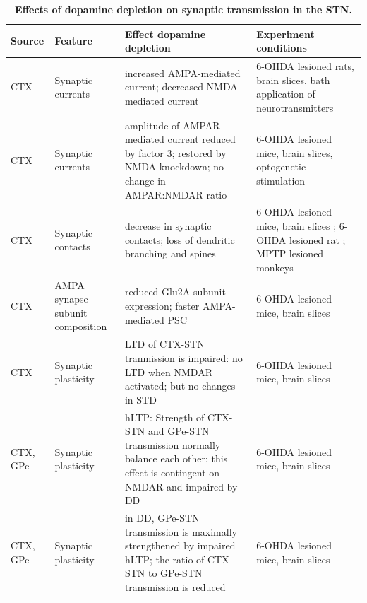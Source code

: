 %
\begin{table} %
\centering
\caption{{\bf Effects of dopamine depletion on synaptic transmission in the STN.}}
%
\begin{tabular}{p{0.06\textheight}p{0.15\textheight}p{0.35\textheight}p{0.35\textheight}}%
\toprule
Source & Feature & Effect dopamine depletion & Experiment conditions \\ \midrule
CTX & Synaptic currents & increased AMPA-mediated current; decreased NMDA-mediated current & 6-OHDA lesioned rats, brain slices, bath application of neurotransmitters \cite{shen_dopamine_2005} \\
CTX & Synaptic currents & amplitude of AMPAR-mediated current reduced by factor 3; restored by NMDA knockdown; no change in AMPAR:NMDAR ratio & 6-OHDA lesioned mice, brain slices, optogenetic stimulation \cite{chu_loss_2017} \\
CTX & Synaptic contacts & decrease in synaptic contacts; loss of dendritic branching and spines & 6-OHDA lesioned mice, brain slices \cite{chu_loss_2017}; 6-OHDA lesioned rat \cite{wang_impaired_2018}; MPTP lesioned monkeys \cite{mathai_reduced_2015} \\
CTX & AMPA synapse subunit composition & reduced Glu2A subunit expression; faster AMPA-mediated PSC & 6-OHDA lesioned mice, brain slices \cite{chu_loss_2017} \\
CTX & Synaptic plasticity & LTD of CTX-STN tranmission is impaired: no LTD when NMDAR activated; but no changes in STD & 6-OHDA lesioned mice, brain slices \cite{chu_loss_2017} \\
CTX, GPe & Synaptic plasticity & hLTP: Strength of CTX-STN and GPe-STN transmission normally balance each other; this effect is contingent on NMDAR and impaired by DD & 6-OHDA lesioned mice, brain slices \cite{chu_loss_2017,chu_heterosynaptic_2015} \\
CTX, GPe & Synaptic plasticity & in DD, GPe-STN transmission is maximally strengthened by impaired hLTP; the ratio of CTX-STN to GPe-STN transmission is reduced & 6-OHDA lesioned mice, brain slices \cite{chu_loss_2017,chu_heterosynaptic_2015} \\
\bottomrule
\end{tabular}
%
\label{tab:dd-connectivy_stn-ctx}
\end{table} %

